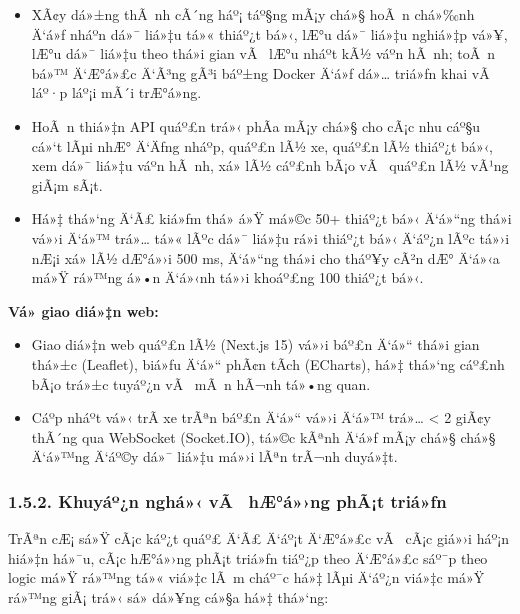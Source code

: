 \documentclass[a4paper]{extarticle}
\providecommand{\tightlist}{%
  \setlength{\itemsep}{0pt}\setlength{\parskip}{0pt}}
\begin{document}
\begin{itemize}
\tightlist
\item
  XÃ¢y dá»±ng thÃ nh cÃ´ng háº¡ táº§ng mÃ¡y chá»§ hoÃ n chá»‰nh Ä‘á»ƒ nháº­n dá»¯ liá»‡u tá»«
  thiáº¿t bá»‹, lÆ°u dá»¯ liá»‡u nghiá»‡p vá»¥, lÆ°u dá»¯ liá»‡u theo thá»i gian vÃ  lÆ°u
  nháº­t kÃ½ váº­n hÃ nh; toÃ n bá»™ Ä‘Æ°á»£c Ä‘Ã³ng gÃ³i báº±ng Docker Ä‘á»ƒ dá»… triá»ƒn khai
  vÃ  láº·p láº¡i mÃ´i trÆ°á»ng.
\item
  HoÃ n thiá»‡n API quáº£n trá»‹ phÃ­a mÃ¡y chá»§ cho cÃ¡c nhu cáº§u cá»‘t lÃµi nhÆ° Ä‘Äƒng
  nháº­p, quáº£n lÃ½ xe, quáº£n lÃ½ thiáº¿t bá»‹, xem dá»¯ liá»‡u váº­n hÃ nh, xá»­ lÃ½ cáº£nh
  bÃ¡o vÃ  quáº£n lÃ½ vÃ¹ng giÃ¡m sÃ¡t.
\item
  Há»‡ thá»‘ng Ä‘Ã£ kiá»ƒm thá»­ á»Ÿ má»©c 50+ thiáº¿t bá»‹ Ä‘á»“ng thá»i vá»›i Ä‘á»™ trá»… tá»« lÃºc dá»¯
  liá»‡u rá»i thiáº¿t bá»‹ Ä‘áº¿n lÃºc tá»›i nÆ¡i xá»­ lÃ½ dÆ°á»›i 500 ms, Ä‘á»“ng thá»i cho
  tháº¥y cÃ²n dÆ° Ä‘á»‹a má»Ÿ rá»™ng á»•n Ä‘á»‹nh tá»›i khoáº£ng 100 thiáº¿t bá»‹.
\end{itemize}

\textbf{Vá» giao diá»‡n web:}

\begin{itemize}
\tightlist
\item
  Giao diá»‡n web quáº£n lÃ½ (Next.js 15) vá»›i báº£n Ä‘á»“ thá»i gian thá»±c
  (Leaflet), biá»ƒu Ä‘á»“ phÃ¢n tÃ­ch (ECharts), há»‡ thá»‘ng cáº£nh bÃ¡o trá»±c tuyáº¿n
  vÃ  mÃ n hÃ¬nh tá»•ng quan.
\item
  Cáº­p nháº­t vá»‹ trÃ­ xe trÃªn báº£n Ä‘á»“ vá»›i Ä‘á»™ trá»… \textless{} 2 giÃ¢y thÃ´ng qua
  WebSocket (Socket.IO), tá»©c kÃªnh Ä‘á»ƒ mÃ¡y chá»§ chá»§ Ä‘á»™ng Ä‘áº©y dá»¯ liá»‡u má»›i lÃªn
  trÃ¬nh duyá»‡t.
\end{itemize}

\subsubsection{1.5.2. Khuyáº¿n nghá»‹ vÃ  hÆ°á»›ng phÃ¡t
triá»ƒn}\label{152-khuyux1ebfn-nghux1ecb-vuxe0-hux1b0ux1edbng-phuxe1t-triux1ec3n}

TrÃªn cÆ¡ sá»Ÿ cÃ¡c káº¿t quáº£ Ä‘Ã£ Ä‘áº¡t Ä‘Æ°á»£c vÃ  cÃ¡c giá»›i háº¡n hiá»‡n há»¯u, cÃ¡c hÆ°á»›ng phÃ¡t
triá»ƒn tiáº¿p theo Ä‘Æ°á»£c sáº¯p theo logic má»Ÿ rá»™ng tá»« viá»‡c lÃ m cháº¯c há»‡ lÃµi Ä‘áº¿n
viá»‡c má»Ÿ rá»™ng giÃ¡ trá»‹ sá»­ dá»¥ng cá»§a há»‡ thá»‘ng:
\end{document}

